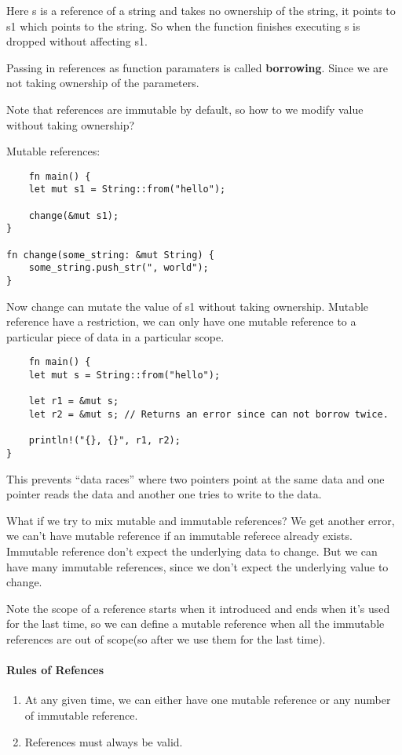 Here s is a reference of a string and takes no ownership of the string, it points to s1 which points to the string.
So when the function finishes executing s is dropped without affecting s1.

\begin{definition}
    Passing in references as function paramaters is called \textbf{borrowing}. Since we are not taking ownership of the parameters.
\end{definition} 
Note that references are immutable by default, so how to we modify value without taking ownership?

Mutable references:

\begin{lstlisting}
    fn main() {
    let mut s1 = String::from("hello");

    change(&mut s1);
}

fn change(some_string: &mut String) {
    some_string.push_str(", world");
}
\end{lstlisting}

Now change can mutate the value of s1 without taking ownership. Mutable reference have a restriction, we can only have one mutable reference to a particular piece of data 
in a particular scope.

\newpage

\begin{lstlisting}
    fn main() {
    let mut s = String::from("hello");

    let r1 = &mut s;
    let r2 = &mut s; // Returns an error since can not borrow twice.

    println!("{}, {}", r1, r2);
}
\end{lstlisting}

This prevents ``data races'' where two pointers point at the same data and one pointer reads the data and another one tries to write to the data.


What if we try to mix mutable and immutable references? We get another error, we can't have mutable reference if an immutable referece already exists. Immutable reference don't expect the underlying data to change.
But we can have many immutable references, since we don't expect the underlying value to change.

Note the scope of a reference starts when it introduced and ends when it's used for the last time, so we can define a mutable reference when all the immutable references are out of scope(so after we use them for the last time).

\paragraph*{Rules of Refences}\begin{enumerate}
    \item At any given time, we can either have one mutable reference or any number of immutable reference.
    \item References must always be valid.
\end{enumerate}

